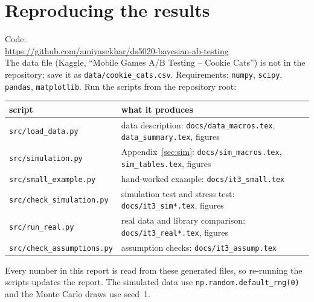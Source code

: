\documentclass[11pt]{article}
\theoremstyle{definition}
\theoremstyle{remark}
\begin{document}
\section{Reproducing the results}\label{sec:repro}
\begin{sloppypar}
\noindent Code:\\
\url{https://github.com/amiyasekhar/ds5020-bayesian-ab-testing}\\
The data file (Kaggle, ``Mobile Games A/B Testing -- Cookie Cats'') is not in the repository; save it as
\texttt{data/cookie\_cats.csv}. Requirements: \texttt{numpy}, \texttt{scipy}, \texttt{pandas}, \texttt{matplotlib}.
Run the scripts from the repository root:
\end{sloppypar}
\begin{center}\small
\begin{tabular}{l p{9cm}}\toprule
script & what it produces\\ \midrule
\texttt{src/load\_data.py} & data description: \texttt{docs/data\_macros.tex}, \texttt{data\_summary.tex}, figures\\
\texttt{src/simulation.py} & Appendix~\ref{sec:sim}: \texttt{docs/sim\_macros.tex}, \texttt{sim\_tables.tex}, figures\\
\texttt{src/small\_example.py} & hand-worked example: \texttt{docs/it3\_small.tex}\\
\texttt{src/check\_simulation.py} & simulation test and stress test: \texttt{docs/it3\_sim*.tex}, figures\\
\texttt{src/run\_real.py} & real data and library comparison: \texttt{docs/it3\_real*.tex}, figures\\
\texttt{src/check\_assumptions.py} & assumption checks: \texttt{docs/it3\_assump.tex}\\
\bottomrule\end{tabular}\normalsize
\end{center}
Every number in this report is read from these generated files, so re-running the scripts updates the report.
The simulated data use \texttt{np.random.default\_rng(0)} and the Monte Carlo draws use seed~1.
\end{document}
